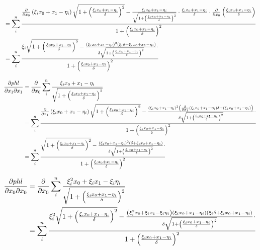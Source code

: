 \documentclass[paper=A3, 
   paper=landscape]{scrartcl}
\begin{document}
\begin{align*}
& = \sum\limits_i^n \frac {\frac{\partial}{\partial x_0} \left( \xi_i x_0 + x_1 -\eta_i \right) \sqrt{ 1+ \left( \frac {\xi_i x_0 + x_1 -\eta_i} {\delta} \right)^2 }- \frac{ \xi_i x_0 + x_1 -\eta_i }{\sqrt{ 1+ \left( \frac {\xi_i x_0 + x_1 -\eta_i} {\delta} \right) ^2}}  \cdot  \frac{\xi_i x_0+x_1-\eta_i}{\delta}  \cdot  \frac{\partial}{\partial x_0} \left( \frac{\xi_i x_0+x_1-\eta_i}{\delta} \right) } {1+ \left( \frac {\xi_i x_0 + x_1 -\eta_i} {\delta} \right) ^2}\\
& = \sum\limits_i^n \frac {\xi_i \sqrt{ 1+ \left( \frac {\xi_i x_0 + x_1 -\eta_i} {\delta} \right)^2 } - \frac{\left( \xi_i x_0 + x_1 -\eta_i \right)^2 \left(\xi_i \delta  + \xi_i x_0+x_1-\eta_i\right)}{\delta \sqrt{ 1+ \left( \frac {\xi_i x_0 + x_1 -\eta_i} {\delta} \right) ^2}} \cdot } {1+ \left( \frac {\xi_i x_0 + x_1 -\eta_i} {\delta} \right)^2}\\
\end{align*}


\begin{align*}
\frac{\partial phl}{\partial x_1 \partial x_1} &= \frac{\partial}{\partial x_0} \sum\limits_i^n \frac {\xi_i x_0 + x_1 -\eta_i}{\sqrt{1+ \left( \frac {\xi_i x_0 + x_1 -\eta_i}{\delta}\right)^2  }}\\
& = \sum\limits_i^n \frac {\frac{\partial}{\partial x_1} \left( \xi_i x_0 + x_1 -\eta_i \right) \sqrt{ 1+ \left( \frac {\xi_i x_0 + x_1 -\eta_i} {\delta} \right)^2 } - \frac{\left( \xi_i x_0 + x_1 -\eta_i \right)^2\left( \frac{\partial}{\partial x_1} \left(\xi_i x_0+x_1-\eta_i \right) \delta  + \left( \xi_i x_0+x_1-\eta_i\right) \right)}{\delta \sqrt{ 1+ \left( \frac {\xi_i x_0 + x_1 -\eta_i} {\delta} \right) ^2}} \cdot } {1+ \left( \frac {\xi_i x_0 + x_1 -\eta_i} {\delta} \right)^2}\\
& = \sum\limits_i^n \frac {\sqrt{ 1+ \left( \frac {\xi_i x_0 + x_1 -\eta_i} {\delta} \right)^2 } - \frac{\left( \xi_i x_0 + x_1 -\eta_i \right)^2\left(\delta  + \xi_i x_0+x_1-\eta_i \right)}{\delta \sqrt{ 1+ \left( \frac {\xi_i x_0 + x_1 -\eta_i} {\delta} \right) ^2}} \cdot } {1+ \left( \frac {\xi_i x_0 + x_1 -\eta_i} {\delta} \right)^2}\\
\end{align*}

\begin{align*}
\frac{\partial phl}{\partial x_0 \partial x_0} &= \frac{\partial}{\partial x_0} \sum\limits_i^n \frac {\xi_i^2x_0 + \xi_ix_1 - \xi_i \eta_i}{\sqrt{1+ \left( \frac {\xi_i x_0 + x_1 -\eta_i}{\delta}\right)^2 }}\\
& = \sum\limits_i^n \frac {\xi_i^2 \sqrt{ 1+ \left( \frac {\xi_i x_0 + x_1 -\eta_i} {\delta} \right)^2 } - \frac{\left( \xi_i^2x_0 + \xi_ix_1 - \xi_i \eta_i \right)\left( \xi_i x_0 + x_1 -\eta_i \right) \left(\xi_i \delta  +  \xi_i x_0+x_1-\eta_i \right)}{\delta \sqrt{ 1+ \left( \frac {\xi_i x_0 + x_1 -\eta_i} {\delta} \right) ^2}} \cdot } {1+ \left( \frac {\xi_i x_0 + x_1 -\eta_i} {\delta} \right)^2}\\
\end{align*}
\end{document}
